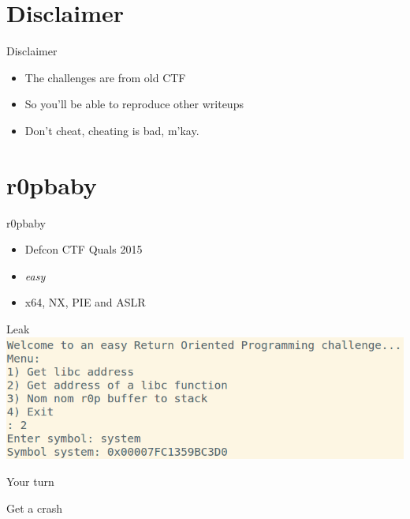 \documentclass{beamer}
\begin{document}
\section{Disclaimer}
\begin{frame}{Disclaimer}
    \begin{itemize}
        \item The challenges are from old CTF
        \item So you'll be able to reproduce other writeups
        \item Don't cheat, cheating is bad, m'kay.
    \end{itemize}
\end{frame}

\section{r0pbaby}
\begin{frame}{r0pbaby}
    \begin{itemize}
        \item Defcon CTF Quals 2015
        \item \emph{easy}
        \item x64, NX, PIE and ASLR
    \end{itemize}
\end{frame}

\begin{frame}{Leak}
    \includegraphics[width=\textwidth]{r0pbaby_leak.png}
\end{frame}

\begin{frame}{Your turn}
    \begin{center}
        \Large Get a crash
    \end{center}
\end{frame}
\end{document}
